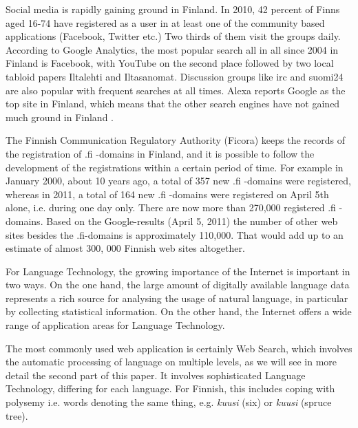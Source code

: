 \documentclass[]{../../metanetpaper}
\begin{document}
\begin{Parallel}[c]{70mm}{70mm}
{Social media is rapidly gaining ground in Finland. In 2010, 42 percent
of Finns aged 16-74 have registered as a user in at least one of the
community based applications (Facebook, Twitter etc.) Two thirds of
them visit the groups daily. According to Google Analytics, the most
popular search all in all since 2004 in Finland is Facebook, with
YouTube on the second place followed by two local tabloid papers
Iltalehti and Iltasanomat. Discussion groups like irc and suomi24 are
also popular with frequent searches at all times. Alexa reports Google
as the top site in Finland, which means that the other search engines
have not gained much ground in Finland \cite{topsites}.

The Finnish Communication Regulatory Authority (Ficora) keeps the
records of the registration of .fi -domains in Finland, and it is
possible to follow the development of the registrations within a
certain period of time. For example in January 2000, about 10 years
ago, a total of 357 new .fi -domains were registered, whereas in 2011,
a total of 164 new .fi -domains were registered on April 5th alone,
i.e. during one day only. There are now more than 270,000 registered
.fi -domains. Based on the Google-results (April 5, 2011) the number
of other web sites besides the .fi-domains is approximately
110,000. That would add up to an estimate of almost 300, 000 Finnish
web sites altogether.

For Language Technology, the growing importance of the Internet is
important in two ways. On the one hand, the large amount of digitally
available language data represents a rich source for analysing the
usage of natural language, in particular by collecting statistical
information. On the other hand, the Internet offers a wide range of
application areas for Language Technology.

The most commonly used web application is certainly Web Search, which
involves the automatic processing of language on multiple levels, as
we will see in more detail the second part of this paper. It involves
sophisticated Language Technology, differing for each language. For
Finnish, this includes coping with polysemy
i.e. words denoting the same thing, e.g.
\textit{\foreignlanguage{finnish}{\textit{kuusi}}} (six) or
\textit{\foreignlanguage{finnish}{\textit{kuusi}}} (spruce tree).

}
\end{Parallel}
\end{document}
